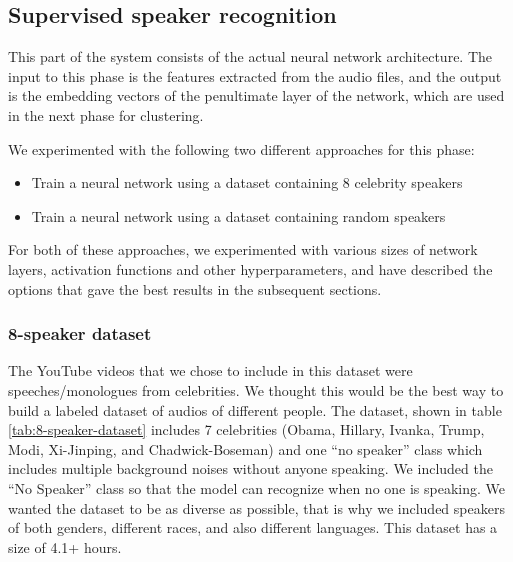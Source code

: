 \documentclass[10pt,twocolumn,letterpaper]{article}
\begin{document}
\subsection{Supervised speaker recognition}
This part of the system consists of the actual neural network architecture. The input to this phase is the features extracted from the audio files, and the output is the embedding vectors of the penultimate layer of the network, which are used in the next phase for clustering.

We experimented with the following two different approaches for this phase:
\begin{itemize}
    \item Train a neural network using a dataset containing 8 celebrity speakers
    \item Train a neural network using a dataset containing random speakers
\end{itemize}
For both of these approaches, we experimented with various sizes of network layers, activation functions and other hyperparameters, and have described the options that gave the best results in the subsequent sections.
\subsubsection{8-speaker dataset}

The YouTube videos that we chose to include in this dataset were speeches/monologues from celebrities. We thought this would be the best way to build a labeled dataset of audios of different people. The dataset, shown in table \ref{tab:8-speaker-dataset} includes 7 celebrities (Obama, Hillary, Ivanka, Trump, Modi, Xi-Jinping, and Chadwick-Boseman) and one “no speaker” class which includes multiple background noises without anyone speaking. We included the “No Speaker” class so that the model can recognize when no one is speaking.  We wanted the dataset to be as diverse as possible, that is why we included speakers of both genders, different races, and also different languages. This dataset has a size of 4.1+ hours. 
\end{document}
